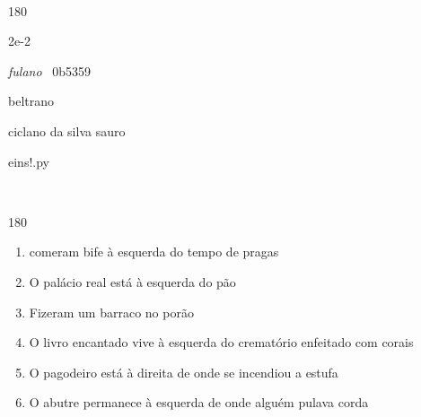 \documentclass[12pt]{article}
\begin{document}
	\pagebreak
\ttfamily


	\ 
	\vfill
	\begin{turn}{180}	
		\begin{minipage}{\textwidth}
			\centering
			{\Huge 2e-2}	
			
			\hfill
			
			\textit{fulano} 
			\ 
			0b5359
			
			
			beltrano
			
			ciclano da silva sauro
			
			\bigskip
			
			eins!.py
		\end{minipage}	
	\end{turn}
	\vfill
	\

\pagebreak

	\begin{turn}{180}	
		\begin{minipage}{\textwidth}
				
		\end{minipage}	
	\end{turn} 

\pagebreak
\sffamily
\large

	\begin{enumerate}
		\vfill \item comeram bife à esquerda do tempo de pragas 
		\vfill \item O palácio real está à esquerda do pão 
		\vfill \item Fizeram um barraco  no porão 
		\vfill \item O livro encantado vive à esquerda do crematório enfeitado com corais 
		\vfill \item O pagodeiro está à direita de onde se incendiou a estufa
		\vfill \item O abutre permanece à esquerda de onde alguém pulava corda
		
	\end{enumerate}
\end{document}

